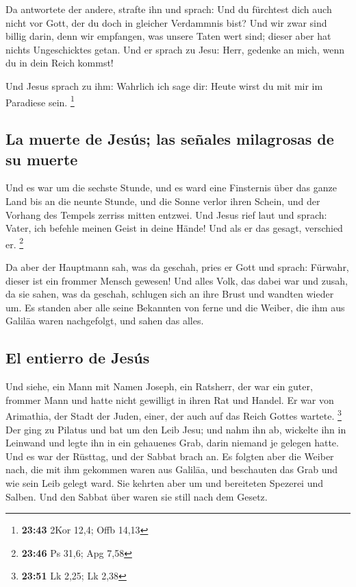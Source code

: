  Da antwortete der andere, strafte ihn und sprach: Und du
fürchtest dich auch nicht vor Gott, der du doch in gleicher Verdammnis
bist?  Und wir zwar sind billig darin, denn wir
empfangen, was unsere Taten wert sind; dieser aber hat nichts
Ungeschicktes getan.  Und er sprach zu Jesu: Herr,
gedenke an mich, wenn du in dein Reich kommst!

 Und Jesus sprach zu ihm: Wahrlich ich sage dir: Heute
wirst du mit mir im Paradiese sein. \footnote{\textbf{23:43} 2Kor 12,4;
  Offb 14,13}

\hypertarget{la-muerte-de-jesuxfas-las-seuxf1ales-milagrosas-de-su-muerte}{%
\subsection{La muerte de Jesús; las señales milagrosas de su
muerte}\label{la-muerte-de-jesuxfas-las-seuxf1ales-milagrosas-de-su-muerte}}

 Und es war um die sechste Stunde, und es ward eine
Finsternis über das ganze Land bis an die neunte Stunde, 
und die Sonne verlor ihren Schein, und der Vorhang des Tempels zerriss
mitten entzwei.  Und Jesus rief laut und sprach: Vater,
ich befehle meinen Geist in deine Hände! Und als er das gesagt,
verschied er. \footnote{\textbf{23:46} Ps 31,6; Apg 7,58}

 Da aber der Hauptmann sah, was da geschah, pries er Gott
und sprach: Fürwahr, dieser ist ein frommer Mensch gewesen!
 Und alles Volk, das dabei war und zusah, da sie sahen,
was da geschah, schlugen sich an ihre Brust und wandten wieder um.
 Es standen aber alle seine Bekannten von ferne und die
Weiber, die ihm aus Galiläa waren nachgefolgt, und sahen das alles.

\hypertarget{el-entierro-de-jesuxfas}{%
\subsection{El entierro de Jesús}\label{el-entierro-de-jesuxfas}}

 Und siehe, ein Mann mit Namen Joseph, ein Ratsherr, der
war ein guter, frommer Mann  und hatte nicht gewilligt in
ihren Rat und Handel. Er war von Arimathia, der Stadt der Juden, einer,
der auch auf das Reich Gottes wartete. \footnote{\textbf{23:51} Lk 2,25;
  Lk 2,38}  Der ging zu Pilatus und bat um den Leib Jesu;
 und nahm ihn ab, wickelte ihn in Leinwand und legte ihn
in ein gehauenes Grab, darin niemand je gelegen hatte. 
Und es war der Rüsttag, und der Sabbat brach an.  Es
folgten aber die Weiber nach, die mit ihm gekommen waren aus Galiläa,
und beschauten das Grab und wie sein Leib gelegt ward. 
Sie kehrten aber um und bereiteten Spezerei und Salben. Und den Sabbat
über waren sie still nach dem Gesetz.

